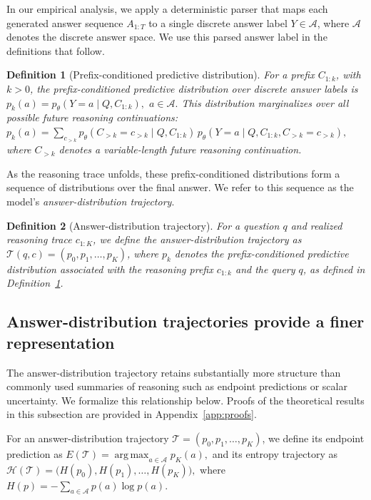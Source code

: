 \documentclass{article}
\newtheorem{definition}{Definition}
\DeclareMathOperator*{\argmax}{arg\,max}
\begin{document}
In our empirical analysis, we apply a deterministic parser that maps each generated answer sequence \(A_{1:T}\) to a single discrete answer label \(Y \in \mathcal{A}\), where \(\mathcal{A}\) denotes the discrete answer space. We use this parsed answer label in the definitions that follow.

\begin{definition}[Prefix-conditioned predictive distribution]
For a prefix  \(C_{1:k}\), with \(k>0\), the \emph{prefix-conditioned predictive distribution} over discrete answer labels is
\(
p_k(a)
=
p_\theta(Y=a\mid Q,C_{1:k}),
\)
\(
a\in\mathcal{A}.
\)
This distribution marginalizes over all possible future reasoning continuations:
\(
p_k(a)
=
\sum_{c_{>k}}
p_\theta(C_{>k}=c_{>k}\mid Q,C_{1:k})
\,
p_\theta(
Y=a
\mid
Q,C_{1:k},C_{>k}=c_{>k}
),
\)
where \(C_{>k}\) denotes a variable-length future reasoning continuation.
\label{def:prefixpredictive}
\end{definition}

As the reasoning trace unfolds, these prefix-conditioned distributions form a sequence of distributions over the final answer. We refer to this sequence as the model’s \emph{answer-distribution trajectory}.

\begin{definition}[Answer-distribution trajectory]
For a question \(q\) and realized reasoning trace \(c_{1:K}\), we define the \emph{answer-distribution trajectory} as
$
\mathcal{T}(q,c)
=
\left(p_0,p_1,\ldots,p_K\right)
$,
where \(p_k\) denotes the prefix-conditioned predictive distribution associated with the reasoning prefix \(c_{1:k}\) and the query \(q\), as defined in Definition~\ref{def:prefixpredictive}.
\end{definition}

\subsection{Answer-distribution trajectories provide a finer representation}
\label{sec:information}

The answer-distribution trajectory retains substantially more structure than commonly used summaries of reasoning such as endpoint predictions or scalar uncertainty. We formalize this relationship below. Proofs of the theoretical results in this subsection are provided in Appendix~\ref{app:proofs}.

For an answer-distribution trajectory \(\mathcal{T}=(p_0,p_1,\ldots,p_K)\), we define its endpoint prediction as
$
E(\mathcal{T})
=
\argmax_{a\in\mathcal{A}} p_K(a),
$
and its entropy trajectory as
$
\mathcal{H}(\mathcal{T})
=
\bigl(H(p_0),H(p_1),\ldots,H(p_K)\bigr),
$
where
$
H(p)
=
-\sum_{a\in\mathcal{A}} p(a)\log p(a).
$
\end{document}
